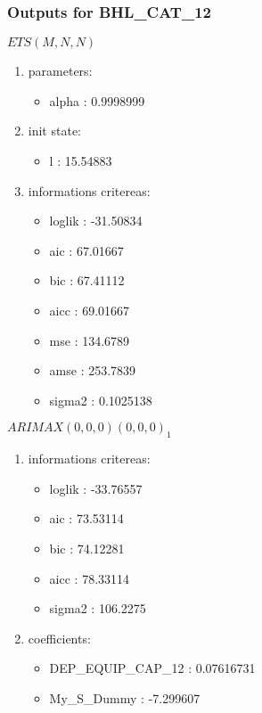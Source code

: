 \documentclass[10pt,a4paper]{article}\usepackage[]{graphicx}\usepackage[]{color}
\newcommand{\AaA}{\_}
\begin{document}
\subsubsection{Outputs for BHL\AaA CAT\AaA 12}
\begin{multicols}{2}


$ ETS(M,N,N) $
\begin{enumerate}
\item parameters:
\begin{itemize}
\item  alpha :  0.9998999 
\end{itemize}
\item init state:
\begin{itemize}
\item  l :  15.54883 
\end{itemize}
\item informations critereas:
\begin{itemize}
\item  loglik :  -31.50834 
\item  aic :  67.01667 
\item  bic :  67.41112 
\item  aicc :  69.01667 
\item  mse :  134.6789 
\item  amse :  253.7839 
\item  sigma2 :  0.1025138 
\end{itemize}
\end{enumerate}

\columnbreak


 $ARIMAX(0,0,0)(0,0,0)_{1}$ 
\begin{enumerate}
\item informations critereas:
\begin{itemize}
\item  loglik :  -33.76557 
\item  aic :  73.53114 
\item  bic :  74.12281 
\item  aicc :  78.33114 
\item  sigma2 :  106.2275 
\end{itemize}

\item coefficients:
\begin{itemize}
\item  DEP\AaA EQUIP\AaA CAP\AaA 12 :  0.07616731 
\item  My_S_Dummy :  -7.299607 
\end{itemize}
\end{enumerate}
\end{multicols}
\end{document}
